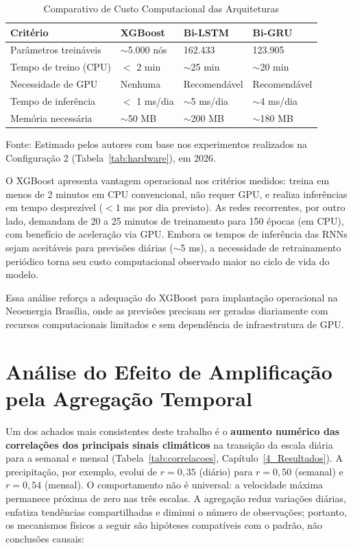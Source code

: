 \begin{table}[H]
\caption{Comparativo de Custo Computacional das Arquiteturas}
\label{tab:custo_computacional}
\begin{center}
\small
\begin{tabular}{p{4.5cm} p{3cm} p{3cm} p{3cm}}
\toprule
\textbf{Critério} & \textbf{XGBoost} & \textbf{Bi-LSTM} & \textbf{Bi-GRU} \\
\midrule
Parâmetros treináveis & $\sim$5.000 nós & 162.433 & 123.905 \\
Tempo de treino (CPU) & $<$ 2 min & $\sim$25 min & $\sim$20 min \\
Necessidade de GPU & Nenhuma & Recomendável & Recomendável \\
Tempo de inferência & $<$ 1 ms/dia & $\sim$5 ms/dia & $\sim$4 ms/dia \\
Memória necessária & $\sim$50 MB & $\sim$200 MB & $\sim$180 MB \\
\bottomrule
\end{tabular}
\normalsize
\end{center}
\small{Fonte: Estimado pelos autores com base nos experimentos realizados na Configuração 2 (Tabela~\ref{tab:hardware}), em 2026.}
\end{table}

O XGBoost apresenta vantagem operacional nos critérios medidos: treina em menos de 2 minutos em CPU convencional, não requer GPU, e realiza inferências em tempo desprezível ($<1$ ms por dia previsto). As redes recorrentes, por outro lado, demandam de 20 a 25 minutos de treinamento para 150 épocas (em CPU), com benefício de aceleração via GPU. Embora os tempos de inferência das RNNs sejam aceitáveis para previsões diárias ($\sim$5 ms), a necessidade de retrainamento periódico torna seu custo computacional observado maior no ciclo de vida do modelo.

Essa análise reforça a adequação do XGBoost para implantação operacional na Neoenergia Brasília, onde as previsões precisam ser geradas diariamente com recursos computacionais limitados e sem dependência de infraestrutura de GPU.

\section{Análise do Efeito de Amplificação pela Agregação Temporal}

Um dos achados mais consistentes deste trabalho é o \textbf{aumento numérico das correlações dos principais sinais climáticos} na transição da escala diária para a semanal e mensal (Tabela~\ref{tab:correlacoes}, Capítulo~\ref{4_Resultados}). A precipitação, por exemplo, evolui de $r = 0{,}35$ (diário) para $r = 0{,}50$ (semanal) e $r = 0{,}54$ (mensal). O comportamento não é universal: a velocidade máxima permanece próxima de zero nas três escalas. A agregação reduz variações diárias, enfatiza tendências compartilhadas e diminui o número de observações; portanto, os mecanismos físicos a seguir são hipóteses compatíveis com o padrão, não conclusões causais:

